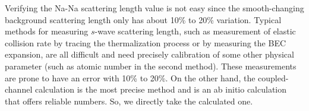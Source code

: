 Verifying the Na-Na scattering length value is not easy since the smooth-changing background scattering length only has about 10\% to 20\% variation. Typical methods for measuring $s$-wave scattering length, such as measurement of elastic collision rate by tracing the thermalization process\cite{} or by measuring the BEC expansion\cite{}, are all difficult and need precisely calibration of some other physical parameter (such as atomic number in the second method). These measurements are prone to have an error with 10\% to 20\%. On the other hand, the coupled-channel calculation is the most precise method and is an ab initio calculation that offers reliable numbers. So, we directly take the calculated one.
